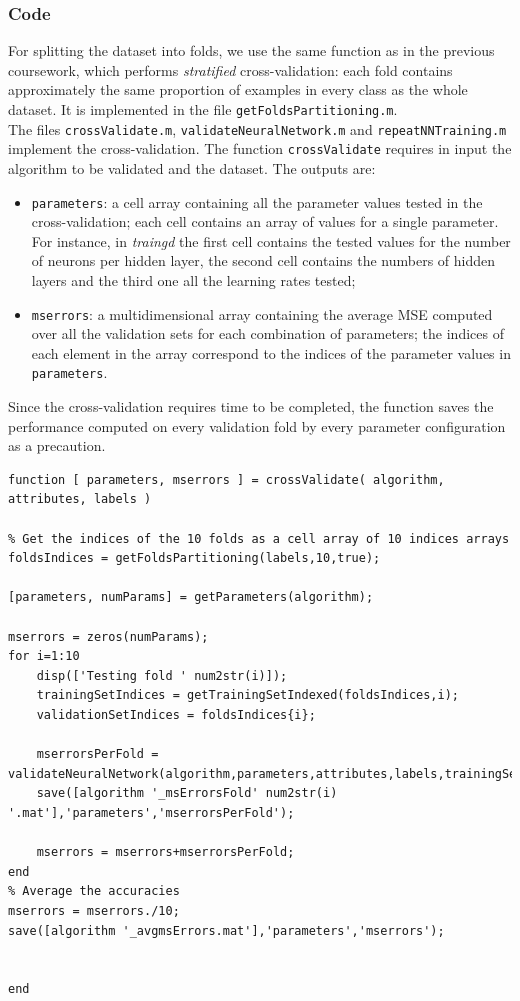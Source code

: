 \documentclass{article}
\begin{document}
\subsubsection*{Code}
For splitting the dataset into folds, we use the same function as in the previous coursework, which performs \emph{stratified} cross-validation: each fold contains approximately the same proportion of examples in every class as the whole dataset. It is implemented in the file \verb$getFoldsPartitioning.m$.\\
The files \verb$crossValidate.m$, \verb$validateNeuralNetwork.m$ and \verb$repeatNNTraining.m$ implement the cross-validation. The function \verb$crossValidate$ requires in input the algorithm to be validated and the dataset. The outputs are:
\begin{itemize}
	\item \verb$parameters$: a cell array containing all the parameter values tested in the cross-validation; each cell contains an array of values for a single parameter. For instance, in \emph{traingd} the first cell contains the tested values for the number of neurons per hidden layer, the second cell contains the numbers of hidden layers and the third one all the learning rates tested;
	\item \verb$mserrors$: a multidimensional array containing the average MSE computed over all the validation sets for each combination of parameters; the indices of each element in the array correspond to the indices of the parameter values in \verb$parameters$.
\end{itemize}
Since the cross-validation requires time to be completed, the function saves the performance computed on every validation fold by every parameter configuration as a precaution.
\begin{lstlisting}[breaklines=true]
function [ parameters, mserrors ] = crossValidate( algorithm, attributes, labels )

% Get the indices of the 10 folds as a cell array of 10 indices arrays
foldsIndices = getFoldsPartitioning(labels,10,true);

[parameters, numParams] = getParameters(algorithm);

mserrors = zeros(numParams);
for i=1:10
    disp(['Testing fold ' num2str(i)]);
    trainingSetIndices = getTrainingSetIndexed(foldsIndices,i);
    validationSetIndices = foldsIndices{i};
    
    mserrorsPerFold = validateNeuralNetwork(algorithm,parameters,attributes,labels,trainingSetIndices,validationSetIndices);
    save([algorithm '_msErrorsFold' num2str(i) '.mat'],'parameters','mserrorsPerFold');
    
    mserrors = mserrors+mserrorsPerFold;
end
% Average the accuracies
mserrors = mserrors./10;
save([algorithm '_avgmsErrors.mat'],'parameters','mserrors');


end


\end{lstlisting}
\end{document}
